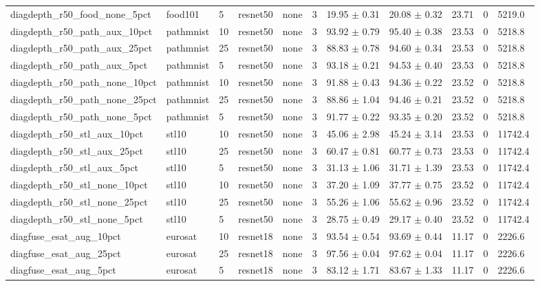 \begin{tabular}{lllllllllll}
diagdepth_r50_food_none_5pct & food101 & 5 & resnet50 & none & 3 & 19.95 $\pm$ 0.31 & 20.08 $\pm$ 0.32 & 23.71 & 0 & 5219.0 \\
diagdepth_r50_path_aux_10pct & pathmnist & 10 & resnet50 & none & 3 & 93.92 $\pm$ 0.79 & 95.40 $\pm$ 0.38 & 23.53 & 0 & 5218.8 \\
diagdepth_r50_path_aux_25pct & pathmnist & 25 & resnet50 & none & 3 & 88.83 $\pm$ 0.78 & 94.60 $\pm$ 0.34 & 23.53 & 0 & 5218.8 \\
diagdepth_r50_path_aux_5pct & pathmnist & 5 & resnet50 & none & 3 & 93.18 $\pm$ 0.21 & 94.53 $\pm$ 0.40 & 23.53 & 0 & 5218.8 \\
diagdepth_r50_path_none_10pct & pathmnist & 10 & resnet50 & none & 3 & 91.88 $\pm$ 0.43 & 94.36 $\pm$ 0.22 & 23.52 & 0 & 5218.8 \\
diagdepth_r50_path_none_25pct & pathmnist & 25 & resnet50 & none & 3 & 88.86 $\pm$ 1.04 & 94.46 $\pm$ 0.21 & 23.52 & 0 & 5218.8 \\
diagdepth_r50_path_none_5pct & pathmnist & 5 & resnet50 & none & 3 & 91.77 $\pm$ 0.22 & 93.35 $\pm$ 0.20 & 23.52 & 0 & 5218.8 \\
diagdepth_r50_stl_aux_10pct & stl10 & 10 & resnet50 & none & 3 & 45.06 $\pm$ 2.98 & 45.24 $\pm$ 3.14 & 23.53 & 0 & 11742.4 \\
diagdepth_r50_stl_aux_25pct & stl10 & 25 & resnet50 & none & 3 & 60.47 $\pm$ 0.81 & 60.77 $\pm$ 0.73 & 23.53 & 0 & 11742.4 \\
diagdepth_r50_stl_aux_5pct & stl10 & 5 & resnet50 & none & 3 & 31.13 $\pm$ 1.06 & 31.71 $\pm$ 1.39 & 23.53 & 0 & 11742.4 \\
diagdepth_r50_stl_none_10pct & stl10 & 10 & resnet50 & none & 3 & 37.20 $\pm$ 1.09 & 37.77 $\pm$ 0.75 & 23.52 & 0 & 11742.4 \\
diagdepth_r50_stl_none_25pct & stl10 & 25 & resnet50 & none & 3 & 55.26 $\pm$ 1.06 & 55.62 $\pm$ 0.96 & 23.52 & 0 & 11742.4 \\
diagdepth_r50_stl_none_5pct & stl10 & 5 & resnet50 & none & 3 & 28.75 $\pm$ 0.49 & 29.17 $\pm$ 0.40 & 23.52 & 0 & 11742.4 \\
diagfuse_esat_aug_10pct & eurosat & 10 & resnet18 & none & 3 & 93.54 $\pm$ 0.54 & 93.69 $\pm$ 0.44 & 11.17 & 0 & 2226.6 \\
diagfuse_esat_aug_25pct & eurosat & 25 & resnet18 & none & 3 & 97.56 $\pm$ 0.04 & 97.62 $\pm$ 0.04 & 11.17 & 0 & 2226.6 \\
diagfuse_esat_aug_5pct & eurosat & 5 & resnet18 & none & 3 & 83.12 $\pm$ 1.71 & 83.67 $\pm$ 1.33 & 11.17 & 0 & 2226.6 \\

\end{tabular}
